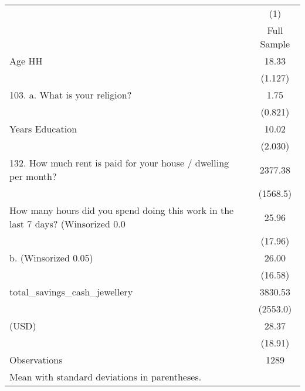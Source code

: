 {
\def\sym#1{\ifmmode^{#1}\else\(^{#1}\)\fi}
\begin{tabular}{l*{1}{c}}
\hline\hline
                    &\multicolumn{1}{c}{(1)}\\
                    &\multicolumn{1}{c}{Full Sample}\\
\hline
Age HH              &       18.33         \\
                    &     (1.127)         \\
[1em]
103.    a.      What is your religion?&        1.75         \\
                    &     (0.821)         \\
[1em]
Years Education     &       10.02         \\
                    &     (2.030)         \\
[1em]
132.     How much rent is paid for your house / dwelling per month?&     2377.38         \\
                    &    (1568.5)         \\
[1em]
How many hours did you spend doing this work in the last 7 days? (Winsorized 0.0&       25.96         \\
                    &     (17.96)         \\
[1em]
b. (Winsorized 0.05)&       26.00         \\
                    &     (16.58)         \\
[1em]
total\_savings\_cash\_jewellery&     3830.53         \\
                    &    (2553.0)         \\
[1em]
 (USD)              &       28.37         \\
                    &     (18.91)         \\
\hline
Observations        &        1289         \\
\hline\hline
\multicolumn{2}{l}{\footnotesize Mean with standard deviations in parentheses.}\\
\end{tabular}
}
